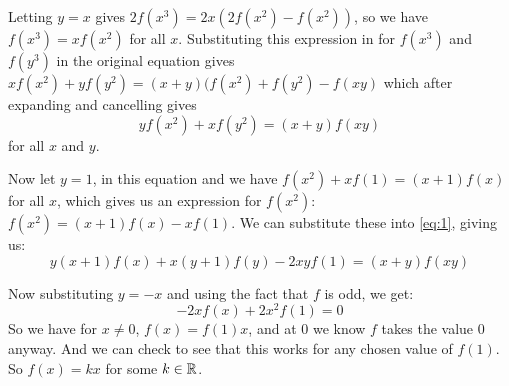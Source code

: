 \documentclass[a4paper,12pt,fleqn]{article}
\begin{document}
\begin{enumerate}
  Letting \(y = x\) gives \(2f(x^3) = 2x(2f(x^2) - f(x^2))\), so we have
  \(f(x^3) = xf(x^2)\) for all \(x\). Substituting this expression in for
  \(f(x^3)\) and \(f(y^3)\) in the original equation gives
  \(xf(x^2) + yf(y^2) = (x + y)(f(x^2) + f(y^2) - f(xy)\) which after expanding
  and cancelling gives
  \begin{equation} \label{eq:1}
   yf(x^2) + xf(y^2) = (x + y)f(xy)
  \end{equation}
  for all \(x\) and \(y\).

  Now let \(y = 1\), in this equation and we have
  \(f(x^2) + xf(1) = (x+1)f(x)\) for all \(x\), which gives us an expression for
  \(f(x^2)\): \(f(x^2) = (x+1)f(x) - xf(1)\). We can substitute these into
  \ref{eq:1}, giving us:
  \begin{equation*}
   y(x+1)f(x) + x(y+1)f(y) - 2xyf(1) = (x+y)f(xy)
  \end{equation*}

  Now substituting \(y = -x\) and using the fact that \(f\) is odd, we get:
  \begin{equation*}
    -2xf(x) + 2x^2f(1) = 0
  \end{equation*}
  So we have for \(x \neq 0\), \(f(x) = f(1)x\), and at \(0\) we know \(f\)
  takes the value \(0\) anyway. And we can check to see that this works for any
  chosen value of \(f(1)\). So \(f(x) = kx\) for some \(k \in \mathbb R\).
\end{enumerate}
\end{document}
